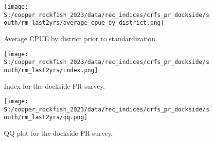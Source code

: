 \documentclass[11pt,
  english,
  letterpaper,
]{article}
\begin{document}
\begin{figure}
\centering
\texttt{[image: S:/copper\_rockfish\_2023/data/rec\_indices/crfs\_pr\_dockside/south/rm\_last2yrs/average\_cpue\_by\_district.png]}
\caption{Average CPUE by district prior to standardization.\label{fig:pr-districtcpue}}
\end{figure}

\newpage

\begin{figure}
\centering
\texttt{[image: S:/copper\_rockfish\_2023/data/rec\_indices/crfs\_pr\_dockside/south/rm\_last2yrs/index.png]}
\caption{Index for the dockside PR survey.\label{fig:pr-index}}
\end{figure}

\newpage

\begin{figure}
\centering
\texttt{[image: S:/copper\_rockfish\_2023/data/rec\_indices/crfs\_pr\_dockside/south/rm\_last2yrs/qq.png]}
\caption{QQ plot for the dockside PR survey.\label{fig:pr-qq}}
\end{figure}

\newpage
\end{document}
